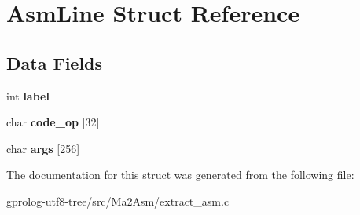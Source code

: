 \hypertarget{structAsmLine}{}\section{Asm\+Line Struct Reference}
\label{structAsmLine}
\subsection*{Data Fields}
\begin{DoxyCompactItemize}
\item 
int {\bfseries label}\hypertarget{structAsmLine_a1b7f8a7f299218d0be5d2e5e15bb974e}{}\label{structAsmLine_a1b7f8a7f299218d0be5d2e5e15bb974e}

\item 
char {\bfseries code\+\_\+op} \mbox{[}32\mbox{]}\hypertarget{structAsmLine_af94ff4cc2a4abfdf5eed77061fd34f68}{}\label{structAsmLine_af94ff4cc2a4abfdf5eed77061fd34f68}

\item 
char {\bfseries args} \mbox{[}256\mbox{]}\hypertarget{structAsmLine_a77453b03d07a24336adf4f62b5bbc9c8}{}\label{structAsmLine_a77453b03d07a24336adf4f62b5bbc9c8}

\end{DoxyCompactItemize}


The documentation for this struct was generated from the following file\+:\begin{DoxyCompactItemize}
\item 
gprolog-\/utf8-\/tree/src/\+Ma2\+Asm/extract\+\_\+asm.\+c\end{DoxyCompactItemize}
